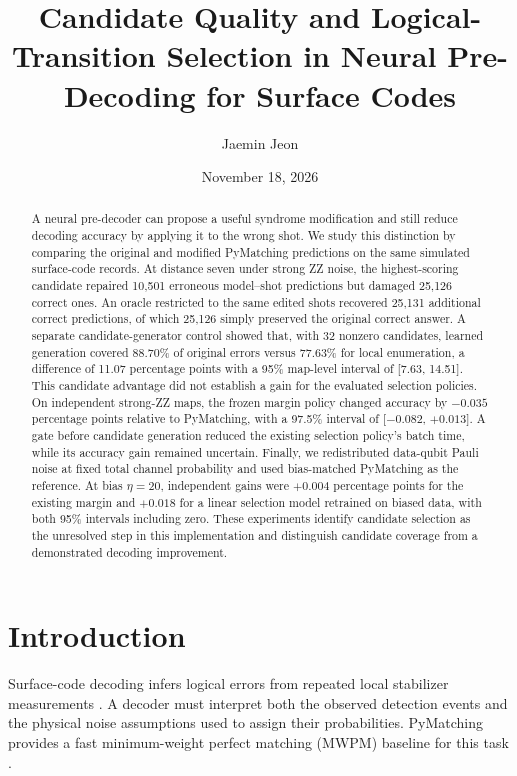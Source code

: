 \documentclass[aps,prd,12pt,twocolumn,superscriptaddress,floatfix]{revtex4-2}
\begin{document}
\title{Candidate Quality and Logical-Transition Selection in Neural Pre-Decoding for Surface Codes}
\author{Jaemin Jeon}
\date{November 18, 2026}

\begin{abstract}
A neural pre-decoder can propose a useful syndrome modification and still reduce decoding accuracy by applying it to the wrong shot. We study this distinction by comparing the original and modified PyMatching predictions on the same simulated surface-code records. At distance seven under strong ZZ noise, the highest-scoring candidate repaired 10,501 erroneous model--shot predictions but damaged 25,126 correct ones. An oracle restricted to the same edited shots recovered 25,131 additional correct predictions, of which 25,126 simply preserved the original correct answer. A separate candidate-generator control showed that, with 32 nonzero candidates, learned generation covered 88.70\% of original errors versus 77.63\% for local enumeration, a difference of 11.07 percentage points with a 95\% map-level interval of [7.63, 14.51]. This candidate advantage did not establish a gain for the evaluated selection policies. On independent strong-ZZ maps, the frozen margin policy changed accuracy by \(-0.035\) percentage points relative to PyMatching, with a 97.5\% interval of [\(-0.082\), \(+0.013\)]. A gate before candidate generation reduced the existing selection policy's batch time, while its accuracy gain remained uncertain. Finally, we redistributed data-qubit Pauli noise at fixed total channel probability and used bias-matched PyMatching as the reference. At bias \(\eta=20\), independent gains were \(+0.004\) percentage points for the existing margin and \(+0.018\) for a linear selection model retrained on biased data, with both 95\% intervals including zero. These experiments identify candidate selection as the unresolved step in this implementation and distinguish candidate coverage from a demonstrated decoding improvement.
\end{abstract}

\maketitle

\section{Introduction}

Surface-code decoding infers logical errors from repeated local stabilizer measurements \cite{fowler2012}. A decoder must interpret both the observed detection events and the physical noise assumptions used to assign their probabilities. PyMatching provides a fast minimum-weight perfect matching (MWPM) baseline for this task \cite{higgott2022,sparseblossom2025}.
\end{document}
